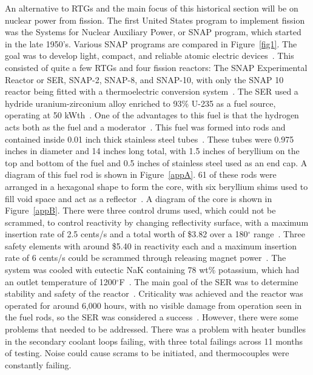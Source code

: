 \documentclass{article}
\begin{document}
An alternative to RTGs and the main focus of this historical section will be on nuclear power from fission. The first United States program to implement fission was the Systems for Nuclear Auxiliary Power, or SNAP program, which started in the late 1950's. Various SNAP programs are compared in Figure~\ref{fig1}. The goal was to develop light, compact, and reliable atomic electric devices~\cite{voss1984snap}. This consisted of quite a few RTGs and four fission reactors: The SNAP Experimental Reactor or SER, SNAP-2, SNAP-8, and SNAP-10, with only the SNAP 10 reactor being fitted with a thermoelectric conversion system~\cite{websnap}. The SER used a hydride uranium-zirconium alloy enriched to 93\% U-235 as a fuel source, operating at 50 kWth~\cite{voss1984snap}. One of the advantages to this fuel is that the hydrogen acts both as the fuel and a moderator~\cite{voss1984snap}. This fuel was formed into rods and contained inside 0.01 inch thick stainless steel tubes~\cite{beall1962final}. These tubes were 0.975 inches in diameter and 14 inches long total, with 1.5 inches of beryllium on the top and bottom of the fuel and 0.5 inches of stainless steel used as an end cap. A diagram of this fuel rod is shown in Figure~\ref{appA}. 61 of these rods were arranged in a hexagonal shape to form the core, with six beryllium shims used to fill void space and act as a reflector~\cite{lords1994snap}. A diagram of the core is shown in Figure~\ref{appB}. There were three control drums used, which could not be scrammed, to control reactivity by changing reflectivity surface, with a maximum insertion rate of 2.5 cents/s and a total worth of \$3.82 over a 180$^{\circ}$ range~\cite{lords1994snap}. Three safety elements with around \$5.40 in reactivity each and a maximum insertion rate of 6 cents/s could be scrammed through releasing magnet power~\cite{lords1994snap}. The system was cooled with eutectic NaK containing 78 wt\% potassium, which had an outlet temperature of 1200$^{\circ}$F~\cite{beall1962final}. The main goal of the SER was to determine stability and safety of the reactor~\cite{voss1984snap}. Criticality was achieved and the reactor was operated for around 6,000 hours, with no visible damage from operation seen in the fuel rods, so the SER was considered a success~\cite{beall1962final}.  However, there were some problems that needed to be addressed. There was a problem with heater bundles in the secondary coolant loops failing, with three total failings across 11 months of testing. Noise could cause scrams to be initiated, and thermocouples were constantly failing.
\end{document}
